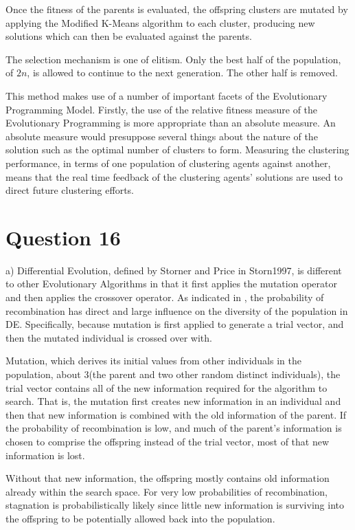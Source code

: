 \documentclass[12pt]{article}
\begin{document}
Once the fitness of the parents is evaluated, the offspring clusters are mutated by applying the Modified K-Means algorithm to each cluster, producing new solutions which can then be evaluated against the parents.

The selection mechanism is one of elitism. Only the best half of the population, of $2n$, is allowed to continue to the next generation. The other half is removed.

This method makes use of a number of important facets of the Evolutionary Programming Model. Firstly, the use of the relative fitness measure of the Evolutionary Programming is more appropriate than an absolute measure. An absolute measure would presuppose several things about the nature of the solution such as the optimal number of clusters to form. Measuring the clustering performance, in terms of one population of clustering agents against another, means that the real time feedback of the clustering agents' solutions are used to direct future clustering efforts.
\section{Question 16}
a) Differential Evolution, defined by Storner and Price in {Storn1997}, is different to other Evolutionary Algorithms in that it first applies the mutation operator and then applies the crossover operator. As indicated in \cite{engelCI02}, the probability of recombination has direct and large influence on the diversity of the population in DE. Specifically, because mutation is first applied to generate a trial vector, and then the mutated individual is crossed over with. 

	Mutation, which derives its initial values from other individuals in the population, about 3(the parent and two other random distinct individuals), the trial vector contains all of the new information required for the algorithm to search. That is, the mutation first creates new information in an individual and then that new information is combined with the old information of the parent. If the probability of recombination is low, and much of the parent's information is chosen to comprise the offspring instead of the trial vector, most of that new information is lost.

	Without that new information, the offspring mostly contains old information already within the search space. For very low probabilities of recombination, stagnation is probabilistically likely since little new information is surviving into the offspring to be potentially allowed back into the population.
\end{document}
